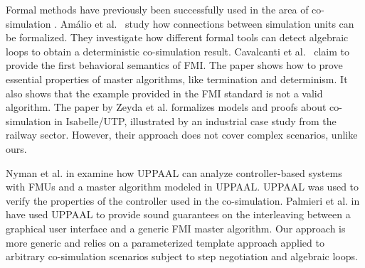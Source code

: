 Formal methods have previously been successfully used in the area of co-simulation \cite{Amalio2016,sampaio_behavioural_2016,cerone_formalising_2018}.
Amálio et al.\ \cite{Amalio2016} study how connections between simulation units can be formalized. They investigate how different formal tools can detect algebraic loops to obtain a deterministic co-simulation result. 
Cavalcanti et al.\ \cite{sampaio_behavioural_2016} claim to provide the first behavioral semantics of FMI. The paper shows how to prove essential properties of master algorithms, like termination and determinism. It also shows that the example provided in the FMI standard is not a valid algorithm. The paper \cite{cerone_formalising_2018} by Zeyda et al. formalizes models and proofs about co-simulation in Isabelle/UTP, illustrated by an industrial case study from the railway sector. 
However, their approach does not cover complex scenarios, unlike ours.

Nyman et al. in \cite{jensen_integrating_2017} examine how UPPAAL can analyze controller-based systems with FMUs and a master algorithm modeled in UPPAAL. UPPAAL was used to verify the properties of the controller used in the co-simulation. Palmieri et al. in \cite{palmieri2019framework} have used UPPAAL to provide sound guarantees on the interleaving between a graphical user interface and a generic FMI master algorithm. 
Our approach is more generic and relies on a parameterized template approach applied to arbitrary co-simulation scenarios subject to step negotiation and algebraic loops.

